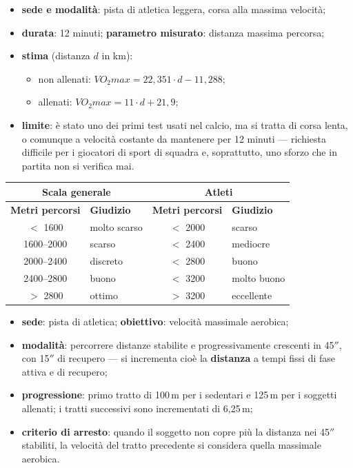 \begin{itemize}
  \item \textbf{sede e modalità}: pista di atletica leggera, corsa alla massima velocità;
  \item \textbf{durata}: 12 minuti; \textbf{parametro misurato}: distanza massima percorsa;
  \item \textbf{stima} (distanza $d$ in km):
    \begin{itemize}
      \item non allenati: $VO_2max = 22{,}351 \cdot d - 11{,}288$;
      \item allenati: $VO_2max = 11 \cdot d + 21{,}9$;
    \end{itemize}
  \item \textbf{limite}: è stato uno dei primi test usati nel calcio, ma si tratta di corsa lenta, o
    comunque a velocità costante da mantenere per 12 minuti --- richiesta difficile per i giocatori
    di sport di squadra e, soprattutto, uno sforzo che in partita non si verifica mai.
\end{itemize}

\begin{table}[htbp]
  \centering
  \small
  \renewcommand{\arraystretch}{1.3}
  \begin{tabularx}{\textwidth}{|c|X|c|X|}
    \hline
    \multicolumn{2}{|c|}{\textbf{Scala generale}} &
    \multicolumn{2}{c|}{\textbf{Atleti}} \\
    \hline
    \textbf{Metri percorsi} & \textbf{Giudizio} & \textbf{Metri percorsi} & \textbf{Giudizio} \\
    \hline
    $<$ 1600 & molto scarso & $<$ 2000 & scarso \\
    \hline
    1600--2000 & scarso & $<$ 2400 & mediocre \\
    \hline
    2000--2400 & discreto & $<$ 2800 & buono \\
    \hline
    2400--2800 & buono & $<$ 3200 & molto buono \\
    \hline
    $>$ 2800 & ottimo & $>$ 3200 & eccellente \\
    \hline
  \end{tabularx}
\end{table}

\begin{itemize}
  \item \textbf{sede}: pista di atletica; \textbf{obiettivo}: velocità massimale aerobica;
  \item \textbf{modalità}: percorrere distanze stabilite e progressivamente crescenti in 45$''$, con
    15$''$ di recupero --- si incrementa cioè la \textbf{distanza} a tempi fissi di fase attiva e di
    recupero;
  \item \textbf{progressione}: primo tratto di 100\,m per i sedentari e 125\,m per i soggetti
    allenati; i tratti successivi sono incrementati di 6,25\,m;
  \item \textbf{criterio di arresto}: quando il soggetto non copre più la distanza nei 45$''$
    stabiliti, la velocità del tratto precedente si considera quella massimale aerobica.
\end{itemize}

